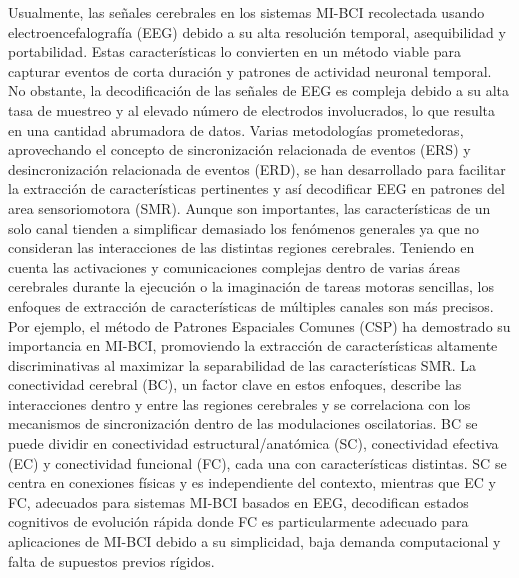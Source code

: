 Usualmente, las señales cerebrales en los sistemas MI-BCI  recolectada usando electroencefalografía (EEG) debido a su alta resolución temporal, asequibilidad y portabilidad. Estas características lo convierten en un método viable para capturar eventos de corta duración y patrones de actividad neuronal temporal. No obstante, la decodificación de las señales de EEG es compleja debido a su alta tasa de muestreo y al elevado número de electrodos involucrados, lo que resulta en una cantidad abrumadora de datos. Varias metodologías prometedoras, aprovechando el concepto de sincronización relacionada de eventos (ERS) y desincronización relacionada de eventos (ERD), se han desarrollado para facilitar la extracción de características pertinentes y así decodificar EEG en patrones del area sensoriomotora (SMR). Aunque son importantes, las características de un solo canal tienden a simplificar demasiado los fenómenos generales ya que no consideran las interacciones de las distintas regiones cerebrales. Teniendo en cuenta las activaciones y comunicaciones complejas dentro de varias áreas cerebrales durante la ejecución o la imaginación de tareas motoras sencillas, los enfoques de extracción de características de múltiples canales son más precisos. Por ejemplo, el método de Patrones Espaciales Comunes (CSP) ha demostrado su importancia en MI-BCI, promoviendo la extracción de características altamente discriminativas al maximizar la separabilidad de las características SMR. La conectividad cerebral (BC), un factor clave en estos enfoques, describe las interacciones dentro y entre las regiones cerebrales y se correlaciona con los mecanismos de sincronización dentro de las modulaciones oscilatorias. BC se puede dividir en conectividad estructural/anatómica (SC), conectividad efectiva (EC) y conectividad funcional (FC), cada una con características distintas. SC se centra en conexiones físicas y es independiente del contexto, mientras que EC y FC, adecuados para sistemas MI-BCI basados en EEG, decodifican estados cognitivos de evolución rápida donde FC es particularmente adecuado para aplicaciones de MI-BCI debido a su simplicidad, baja demanda computacional y falta de supuestos previos rígidos.

